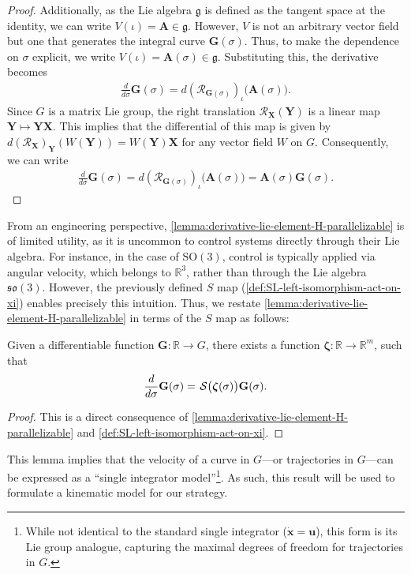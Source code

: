 \begin{proof}
    Additionally, as the Lie algebra $\mathfrak{g}$ is defined as the tangent space at the identity, we can write $V(\iota) = \mathbf{A} \in \mathfrak{g}$. However, $V$ is not an arbitrary vector field but one that generates the integral curve $\mathbf{G}(\sigma)$. Thus, to make the dependence on $\sigma$ explicit, we write $V(\iota) = \mathbf{A}(\sigma) \in \mathfrak{g}$. Substituting this, the derivative becomes
    \begin{align}
        \frac{d}{d\sigma} \mathbf{G}(\sigma) = d(\mathcal{R}_{\mathbf{G}(\sigma)})_{\iota}\bigl(\mathbf{A}(\sigma)\bigr).
    \end{align}
    Since $G$ is a matrix Lie group, the right translation $\mathcal{R}_\mathbf{X}(\mathbf{Y})$ is a linear map $\mathbf{Y}\mapsto \mathbf{Y}\mathbf{X}$. This implies that the differential of this map is given by $d(\mathcal{R}_\mathbf{X})_{\mathbf{Y}}(W(\mathbf{Y})) = W(\mathbf{Y})\mathbf{X}$ \citep[p. 194]{Lee2012} for any vector field $W$ on $G$. Consequently, we can write
    \begin{align}
        \frac{d}{d\sigma} \mathbf{G}(\sigma) = d(\mathcal{R}_{\mathbf{G}(\sigma)})_{\iota}\bigl(\mathbf{A}(\sigma)\bigr) = \mathbf{A}(\sigma)\mathbf{G}(\sigma).
    \end{align}
\end{proof}

From an engineering perspective, \cref{lemma:derivative-lie-element-H-parallelizable} is of limited utility, as it is uncommon to control systems directly through their Lie algebra. For instance, in the case of $\text{SO}(3)$, control is typically applied via angular velocity, which belongs to $\mathbb{R}^3$, rather than through the Lie algebra $\mathfrak{so}(3)$. However, the previously defined $S$ map (\cref{def:SL-left-isomorphism-act-on-xi}) enables precisely this intuition. Thus, we restate \cref{lemma:derivative-lie-element-H-parallelizable} in terms of the $S$ map as follows:
\begin{lemma} \label{lemma:very-important-fact}
    Given a differentiable function $\mathbf{\mathbf{G}}:\mathbb{R}\to G$, there exists a function $\boldsymbol{\zeta}:\mathbb{R}\to\mathbb{R}^m$, such that
    \begin{align}
    \label{eq:importantresult}
    \frac{d}{d\sigma} \mathbf{\mathbf{G}}(\sigma)=\SL\bigl(\boldsymbol{\zeta}(\sigma)\bigr)\mathbf{\mathbf{G}}(\sigma). 
\end{align}
\end{lemma}
\begin{proof} This is a direct consequence of \cref{lemma:derivative-lie-element-H-parallelizable} and \cref{def:SL-left-isomorphism-act-on-xi}. 
\end{proof}
This lemma implies that the velocity of a curve in $G$---or trajectories in $G$---can be expressed as a ``single integrator model''\footnote{While not identical to the standard single integrator ($\dot{\mathbf{x}} = \mathbf{u}$), this form is its Lie group analogue, capturing the maximal degrees of freedom for trajectories in $G$.}. As such, this result will be used to formulate a kinematic model for our strategy.
